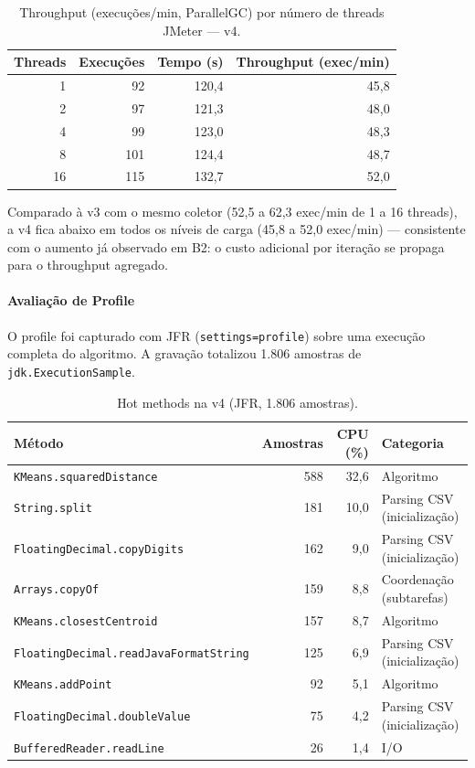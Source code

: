 \begin{table}[H]
\centering
\begin{tabular}{rrrr}
\hline
\textbf{Threads} & \textbf{Execuções} & \textbf{Tempo (s)} & \textbf{Throughput (exec/min)} \\
\hline
1  &  92 & 120{,}4 & 45{,}8 \\
2  &  97 & 121{,}3 & 48{,}0 \\
4  &  99 & 123{,}0 & 48{,}3 \\
8  & 101 & 124{,}4 & 48{,}7 \\
16 & 115 & 132{,}7 & 52{,}0 \\
\hline
\end{tabular}
\caption{Throughput (execuções/min, ParallelGC) por número de threads JMeter --- v4.}
\label{tab:jmeter-v4}
\end{table}

Comparado à v3 com o mesmo coletor (52,5 a 62,3 exec/min de 1 a 16
threads), a v4 fica abaixo em todos os níveis de carga (45,8 a 52,0
exec/min) --- consistente com o aumento já observado em B2: o custo
adicional por iteração se propaga para o throughput agregado.

\paragraph{Avaliação de Profile}

O profile foi capturado com JFR (\texttt{settings=profile}) sobre uma
execução completa do algoritmo. A gravação totalizou 1.806 amostras de
\texttt{jdk.ExecutionSample}.

\begin{table}[H]
\centering
\small
\begin{tabular}{p{7.4cm}rrp{3cm}}
\hline
\textbf{Método} & \textbf{Amostras} & \textbf{CPU (\%)} & \textbf{Categoria} \\
\hline
\texttt{KMeans.squaredDistance}       & 588 & 32{,}6 & Algoritmo \\
\texttt{String.split}                 & 181 & 10{,}0 & Parsing CSV (inicialização) \\
\texttt{FloatingDecimal.copyDigits}   & 162 &  9{,}0 & Parsing CSV (inicialização) \\
\texttt{Arrays.copyOf}                & 159 &  8{,}8 & Coordenação (subtarefas) \\
\texttt{KMeans.closestCentroid}       & 157 &  8{,}7 & Algoritmo \\
\texttt{FloatingDecimal.readJavaFormatString} & 125 &  6{,}9 & Parsing CSV (inicialização) \\
\texttt{KMeans.addPoint}              &  92 &  5{,}1 & Algoritmo \\
\texttt{FloatingDecimal.doubleValue}  &  75 &  4{,}2 & Parsing CSV (inicialização) \\
\texttt{BufferedReader.readLine}      &  26 &  1{,}4 & I/O \\
\hline
\end{tabular}
\caption{Hot methods na v4 (JFR, 1.806 amostras).}
\label{tab:jfr-hot-v4}
\end{table}

